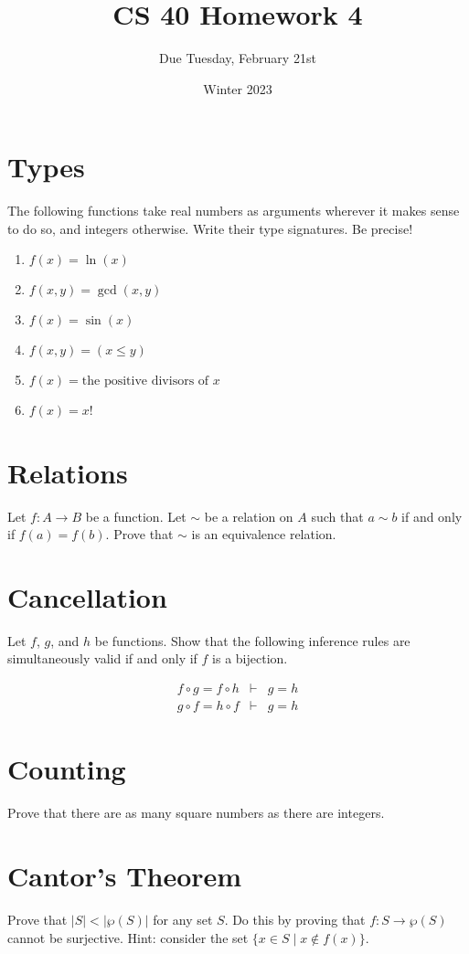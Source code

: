 \documentclass{article}
\title{CS 40 Homework 4}
\author{Due Tuesday, February 21st}
\date{Winter 2023}
\begin{document}
\maketitle


\section{Types}

The following functions take real numbers as arguments wherever it makes sense to do so, and integers otherwise.
Write their type signatures.
Be precise!

\begin{multicols}{2}
\begin{enumerate}[label=\textbf{\alph*.}]
    \setlength{\itemsep}{0pt}
    \item $f(x) = \ln(x)$
    \item $f(x, y) = \gcd (x, y)$
    \item $f(x) = \sin (x)$
    \item $f(x, y) = (x \leq y)$
    \item $f(x) = \text{the positive divisors of } x$
    \item $f(x) = x!$
\end{enumerate}
\end{multicols}


\section{Relations}

Let $f : A \rightarrow B$ be a function.
Let $\sim$ be a relation on $A$ such that $a \sim b$ if and only if $f(a) = f(b)$.
Prove that $\sim$ is an equivalence relation.


\section{Cancellation}

Let $f$, $g$, and $h$ be functions.
Show that the following inference rules are simultaneously valid if and only if $f$ is a bijection.

\vspace{-1em}
\begin{eqnarray*}
f \circ g = f \circ h & \vdash & g = h \\
g \circ f = h \circ f & \vdash & g = h
\end{eqnarray*}


\section{Counting}

Prove that there are as many square numbers as there are integers.


\section{Cantor's Theorem}

Prove that $|S| < |\wp(S)|$ for any set $S$.
Do this by proving that $f : S \rightarrow \wp(S)$ cannot be surjective.
Hint: consider the set $\{x \in S \mid x \notin f(x)\}$.
\end{document}
